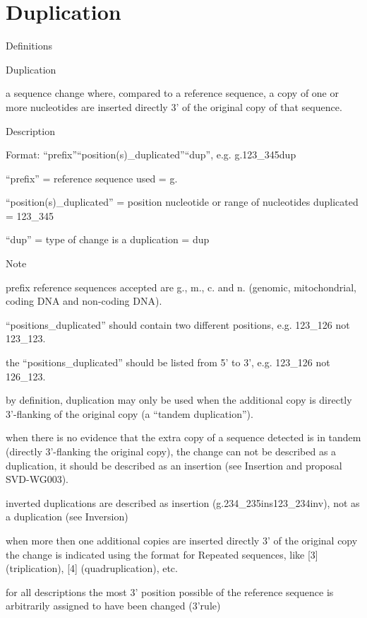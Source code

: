 \documentclass{book}
\begin{document}
	

	\section{Duplication}

	Definitions

	Duplication

	a sequence change where, compared to a reference sequence, a copy of one or more nucleotides are inserted directly 3' of the original copy of that sequence.

	

	

	Description

	Format: “prefix”“position(s)\_duplicated”“dup”, e.g. g.123\_345dup

	“prefix” = reference sequence used = g.

	“position(s)\_duplicated” = position nucleotide or range of nucleotides duplicated = 123\_345

	“dup” = type of change is a duplication = dup

	

	Note

	prefix reference sequences accepted are g., m., c. and n. (genomic, mitochondrial, coding DNA and non-coding DNA).

	“positions\_duplicated” should contain two different positions, e.g. 123\_126 not 123\_123.

	the “positions\_duplicated” should be listed from 5’ to 3’, e.g. 123\_126 not 126\_123.

	by definition, duplication may only be used when the additional copy is directly 3’-flanking of the original copy (a “tandem duplication”). 

	when there is no evidence that the extra copy of a sequence detected is in tandem (directly 3’-flanking the original copy), the change can not be described as a duplication, it should be described as an insertion (see Insertion and proposal SVD-WG003).

	inverted duplications are described as insertion (g.234\_235ins123\_234inv), not as a duplication (see Inversion)

	when more then one additional copies are inserted directly 3’ of the original copy the change is indicated using the format for Repeated sequences, like [3] (triplication), [4] (quadruplication), etc.

	for all descriptions the most 3’ position possible of the reference sequence is arbitrarily assigned to have been changed (3’rule) 
\end{document}
